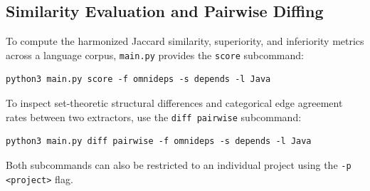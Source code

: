 \subsection*{Similarity Evaluation and Pairwise Diffing}
To compute the harmonized Jaccard similarity, superiority, and inferiority
metrics across a language corpus, \texttt{main.py} provides the \texttt{score}
subcommand:
\begin{verbatim}
python3 main.py score -f omnideps -s depends -l Java
\end{verbatim}
To inspect set-theoretic structural differences and categorical edge agreement
rates between two extractors, use the \texttt{diff pairwise} subcommand:
\begin{verbatim}
python3 main.py diff pairwise -f omnideps -s depends -l Java
\end{verbatim}
Both subcommands can also be restricted to an individual project using the
\texttt{-p <project>} flag.
